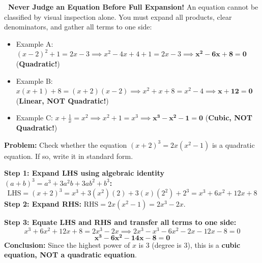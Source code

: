 \documentclass[10pt,a4paper]{article}
\newcommand{\TrapTag}{\tcbox[colback=redpale,colframe=reddeep!40,boxrule=.3pt,arc=1mm,left=1.5mm,right=1.5mm,top=.5mm,bottom=.5mm]{\scriptsize\bfseries\color{reddeep}TRAP ALERT}}
\begin{document}
\begin{warningBox}
  \textbf{\TrapTag\ Never Judge an Equation Before Full Expansion!}
  An equation cannot be classified by visual inspection alone. You must expand all products, clear denominators, and gather all terms to one side:
  \begin{itemize}
    \item Example A: $(x - 2)^2 + 1 = 2x - 3 \implies x^2 - 4x + 4 + 1 = 2x - 3 \implies \mathbf{x^2 - 6x + 8 = 0}$ (\textbf{Quadratic!})
    \item Example B: $x(x + 1) + 8 = (x + 2)(x - 2) \implies x^2 + x + 8 = x^2 - 4 \implies \mathbf{x + 12 = 0}$ (\textbf{Linear, NOT Quadratic!})
    \item Example C: $x + \frac{1}{x} = x^2 \implies x^2 + 1 = x^3 \implies \mathbf{x^3 - x^2 - 1 = 0}$ (\textbf{Cubic, NOT Quadratic!})
  \end{itemize}
\end{warningBox}

\vspace{0.8mm}
\begin{conceptBox}[title={Worked Archetype 1 $\vert$ Algebraic Simplification \& Standard Form Verification},fonttitle=\bfseries\color{navy}]
  \textbf{Problem:} Check whether the equation $(x + 2)^3 = 2x(x^2 - 1)$ is a quadratic equation. If so, write it in standard form.
  \par\vspace{0.6mm}\noindent
  \textbf{Step 1: Expand LHS using algebraic identity $(a + b)^3 = a^3 + 3a^2 b + 3ab^2 + b^3$:}
  $$\text{LHS} = (x + 2)^3 = x^3 + 3(x^2)(2) + 3(x)(2^2) + 2^3 = x^3 + 6x^2 + 12x + 8$$
  \textbf{Step 2: Expand RHS:} $\text{RHS} = 2x(x^2 - 1) = 2x^3 - 2x$.
  \par\noindent
  \textbf{Step 3: Equate LHS and RHS and transfer all terms to one side:}
  $$x^3 + 6x^2 + 12x + 8 = 2x^3 - 2x \implies 2x^3 - x^3 - 6x^2 - 2x - 12x - 8 = 0$$
  $$\mathbf{x^3 - 6x^2 - 14x - 8 = 0}$$
  \textbf{Conclusion:} Since the highest power of $x$ is $3$ (degree is $3$), this is a \textbf{cubic equation, NOT a quadratic equation}.
\end{conceptBox}

\newpage

\thispagestyle{fancy}
\vspace*{0mm}
\end{document}
